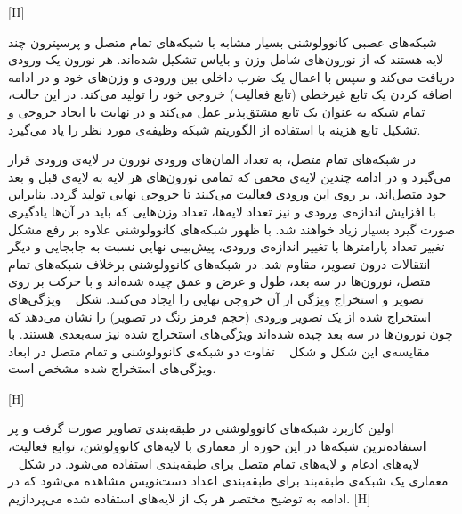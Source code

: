 [H]
 
شبکه‌های عصبی کانوولوشنی بسیار مشابه با شبکه‌های تمام متصل و پرسپترون چند لایه هستند که از نورون‌های شامل وزن و بایاس تشکیل شده‌اند. هر نورون‌ یک ورودی دریافت می‌کند و سپس با اعمال یک ضرب داخلی بین ورودی و وزن‌های خود و در ادامه اضافه کردن یک تابع غیرخطی (تابع فعالیت) خروجی خود را تولید می‌کند. در این حالت، تمام شبکه به عنوان یک تابع مشتق‌پذیر عمل می‌کند و در نهایت با ایجاد خروجی و تشکیل تابع هزینه با استفاده از الگوریتم  شبکه وظیفه‌ی مورد نظر را یاد می‌گیرد.

در شبکه‌های تمام متصل، به تعداد المان‌های ورودی نورون در لایه‌ی ورودی قرار می‌گیرد و در ادامه چندین لایه‌ی مخفی که تمامی نورون‌های هر لایه به لایه‌ی قبل و بعد خود متصل‌اند، بر روی این ورودی فعالیت می‌کنند تا خروجی نهایی تولید گردد. بنابراین با افزایش اندازه‌ی ورودی و نیز تعداد لایه‌ها، تعداد وزن‌هایی که باید در آن‌ها یادگیری صورت گیرد بسیار زیاد خواهند شد. با ظهور شبکه‌های کانوولوشنی علاوه بر رفع مشکل تغییر تعداد پارامترها با تغییر اندازه‌ی ورودی، پیش‌بینی نهایی نسبت به جابجایی و دیگر انتقالات درون تصویر، مقاوم شد. در شبکه‌های کانوولوشنی برخلاف شبکه‌های تمام متصل، نورون‌ها در سه بعد، طول و عرض و عمق چیده شده‌اند و با حرکت بر روی تصویر و استخراج ویژگی از آن خروجی نهایی را ایجاد می‌کنند. شکل ~ ویژگی‌های استخراج شده از یک تصویر ورودی (حجم قرمز رنگ در تصویر) را نشان می‌دهد که چون نورون‌ها در سه بعد چیده شده‌اند ویژگی‌های استخراج شده نیز سه‌بعدی هستند. با مقایسه‌‌ی این شکل و شکل ~  تفاوت دو شبکه‌ی کانوولوشنی و تمام متصل در ابعاد ویژگی‌های استخراج شده مشخص است.

[H]

اولین کاربرد شبکه‌های کانوولوشنی در طبقه‌بندی تصاویر صورت گرفت و پر استفاده‌ترین شبکه‌ها در این حوزه از معماری با لایه‌های کانوولوشن، توابع فعالیت، لایه‌های ادغام و لایه‌های تمام متصل برای طبقه‌بندی استفاده می‌شود. در شکل ~ معماری یک شبکه‌ی طبقه‌بند برای طبقه‌بندی اعداد دست‌نویس مشاهده می‌شود که در ادامه به توضیح مختصر هر یک از لایه‌های استفاده شده می‌پردازیم.
[H]

